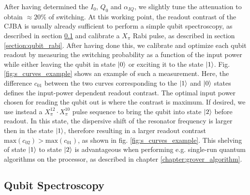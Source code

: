 After having determined the $I_0$, $Q_0$ and $\alpha_{IQ}$, we slightly tune the attenuation to obtain $\approx 20\%$  of switching. At this working point, the readout contrast of the CJBA is usually already sufficient to perform a simple qubit spectroscopy, as described in section \ref{section:qubit_spectroscopy} and calibrate a $X_\pi$ Rabi pulse, as described in section \ref{section:qubit_rabi}. After having done this, we calibrate and optimize each qubit readout by measuring the switching probability as a function of the input power while either leaving the qubit in state $\left| 0 \right>$ or exciting it to the state $\left| 1 \right>$. Fig. \ref{fig:s_curves_example} shows an example of such a measurement. Here, the difference $c_{01}$ between the two curves corresponding to the $\left| 1 \right>$ and $\left| 0 \right>$ states defines the input-power dependent readout contrast. The optimal  input power chosen for reading the qubit out is where the contrast is maximum. If desired, we use instead a $X_\pi^{12}\cdot X_\pi^{10}$ pulse sequence to bring the qubit into state $\left| 2 \right>$ before readout. In this state, the dispersive shift of the resonator frequency is larger then in the state $\left| 1 \right>$, therefore resulting in a larger readout contrast $\mathrm{max}(c_{02})>\mathrm{max}(c_{01})$, as shown in fig. \ref{fig:s_curves_example}. This shelving of state $\left| 1 \right>$ to state $\left| 2 \right>$ is advantageous when performing e.g. single-run quantum algorithms on the processor, as described in chapter \ref{chapter:grover_algorithm}.

\subsection{Qubit Spectroscopy} \label{section:qubit_spectroscopy}


